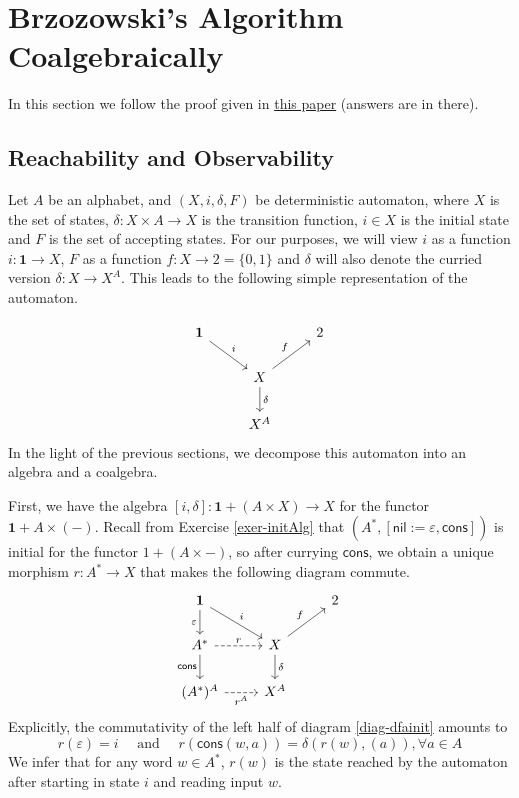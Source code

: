 \documentclass[main.tex]{subfiles}
\begin{document}
\section{Brzozowski's Algorithm Coalgebraically}
In this section we follow the proof given in \href{https://dl.acm.org/doi/10.1145/2490818}{this paper} (answers are in there). 
\subsection{Reachability and Observability}
Let $A$ be an alphabet, and $(X, i, \delta, F)$ be deterministic automaton, where $X$ is the set of states, $\delta:X \times A \rightarrow X$ is the transition function, $i \in X$ is the initial state and $F$ is the set of accepting states. For our purposes, we will view $i$ as a function $i: \mathbf{1} \rightarrow X$, $F$ as a function $f: X \rightarrow 2 = \{0,1\}$ and $\delta$ will also denote the curried version $\delta: X \rightarrow X^A$. This leads to the following simple representation of the automaton.

\begin{equation}\label{diag-dfa}
	\begin{tikzcd}
 \mathbf{1} \arrow[rd, "i"] & & 2 \\
 & X \arrow[d, "\delta"] \arrow[ru, "f"] & \\
 & X^A & 
 \end{tikzcd}
\end{equation}
In the light of the previous sections, we decompose this automaton into an algebra and a coalgebra.

First, we have the algebra $[i,\delta]: \mathbf{1}+(A\times X) \rightarrow X$ for the functor $\mathbf{1}+A\times (-)$. Recall from Exercise \ref{exer-initAlg} that $(A^*, [\textsf{nil}:=\varepsilon, \textsf{cons}])$ is initial for the functor $1+(A\times -)$, so after currying $\textsf{cons}$, we obtain a unique morphism $r:A^*\rightarrow X$ that makes the following diagram commute.
\begin{equation}\label{diag-dfainit}
    \begin{tikzcd}
        \mathbf{1} \arrow[rd, "i"] \arrow[d, "\varepsilon"']  &                                       & 2 \\
        A^* \arrow[d, "\textsf{cons}"'] \arrow[r, "r", dashed] & X \arrow[d, "\delta"] \arrow[ru, "f"] &   \\
        (A^*)^A \arrow[r, "r^A"', dashed]                      & X^A                                   &  
        \end{tikzcd}
\end{equation}
Explicitly, the commutativity of the left half of diagram \ref{diag-dfainit} amounts to
\[
r(\varepsilon) = i \quad \text{ and } \quad 
r(\textsf{cons}(w,a)) = \delta(r(w),(a)), \forall a \in A
\]
We infer that for any word $w \in A^*$, $r(w)$ is the state reached by the automaton after starting in state $i$ and reading input $w$.
\end{document}
